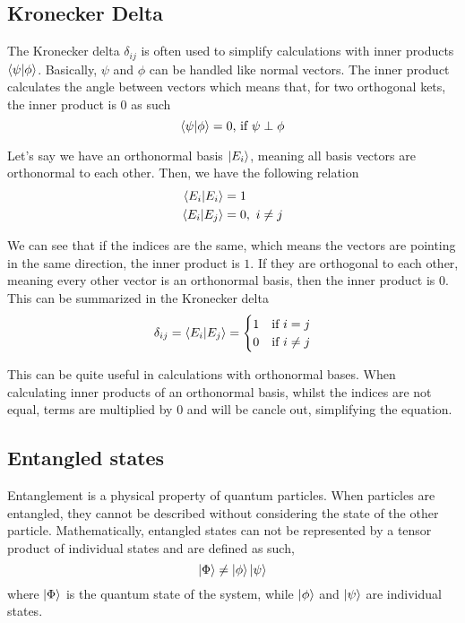 \subsection{Kronecker Delta}
The Kronecker delta $\delta_{ij}$ is often used to simplify calculations with inner products $\braket{\psi | \phi}$.
Basically, $\psi$ and $\phi$ can be handled like normal vectors. 
The inner product calculates the angle between vectors which means that, for two orthogonal kets, the inner product is $0$ as such
\begin{equation}
\braket{\psi|\phi} = 0 \text{, if } \psi \perp \phi\\
\end{equation}

Let's say we have an orthonormal basis $\ket{E_i}$, meaning all basis vectors are orthonormal to each other.
Then, we have the following relation
\begin{equation}
\begin{split}
\braket{E_i|E_i} &= 1\\
\braket{E_i|E_j} &= 0, \ i\neq j
\end{split}
\end{equation}

We can see that if the indices are the same, which means the vectors are pointing in the same direction, the inner product is $1$.
If they are orthogonal to each other, meaning every other vector is an orthonormal basis, then the inner product is $0$.
This can be summarized in the Kronecker delta
\begin{equation}
    \delta_{ij} = \braket{E_i|E_j} = \begin{cases} 1 & \text{if } i=j\\ 0 & \text{if } i \neq j
\end{cases}
\end{equation}

This can be quite useful in calculations with orthonormal bases.
When calculating inner products of an orthonormal basis, whilst the indices are not equal, terms are multiplied by $0$ and will be cancle out, simplifying the equation.

\subsection{Entangled states}
Entanglement is a physical property of quantum particles. 
When particles are entangled, they cannot be described without considering the state of the other particle.
Mathematically, entangled states can not be represented by a tensor product of individual states and are defined as such,
\begin{equation}
    \ket{\Phi} \neq \ket{\phi} \ket{\psi}
\end{equation}
where $\ket{\Phi}$ is the quantum state of the system, while $\ket \phi$ and  $\ket \psi$ are individual states.

